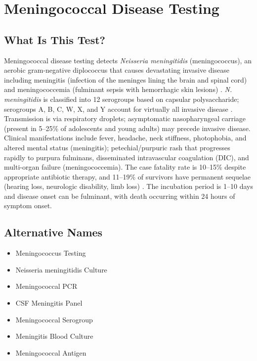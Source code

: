 \chapter{Meningococcal Disease Testing}

\section*{What Is This Test?}
Meningococcal disease testing detects \textit{Neisseria meningitidis} (meningococcus), an aerobic gram-negative diplococcus that causes devastating invasive disease including meningitis (infection of the meninges lining the brain and spinal cord) and meningococcemia (fulminant sepsis with hemorrhagic skin lesions) \cite{stephens2007epidemic}. \textit{N. meningitidis} is classified into 12 serogroups based on capsular polysaccharide; serogroups A, B, C, W, X, and Y account for virtually all invasive disease \cite{borrow2017global}. Transmission is via respiratory droplets; asymptomatic nasopharyngeal carriage (present in 5--25\% of adolescents and young adults) may precede invasive disease. Clinical manifestations include fever, headache, neck stiffness, photophobia, and altered mental status (meningitis); petechial/purpuric rash that progresses rapidly to purpura fulminans, disseminated intravascular coagulation (DIC), and multi-organ failure (meningococcemia). The case fatality rate is 10--15\% despite appropriate antibiotic therapy, and 11--19\% of survivors have permanent sequelae (hearing loss, neurologic disability, limb loss) \cite{stephens2007epidemic}. The incubation period is 1--10 days and disease onset can be fulminant, with death occurring within 24 hours of symptom onset.

\section*{Alternative Names}
\begin{itemize}
  \item Meningococcus Testing
  \item Neisseria meningitidis Culture
  \item Meningococcal PCR
  \item CSF Meningitis Panel
  \item Meningococcal Serogroup
  \item Meningitis Blood Culture
  \item Meningococcal Antigen
\end{itemize}
